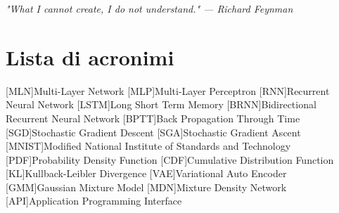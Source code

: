 \documentclass[twoside,openright,titlepage,fleqn,
	headinclude,12pt,a4paper,BCOR=5mm,footinclude]{scrbook}
\begin{document}
\frenchspacing
\raggedbottom
{}
\pagestyle{plain}

\pagestyle{scrheadings}
\tableofcontents
\listoffigures
\cleardoublepage
\thispagestyle{empty}
\begin{flushright}
\null{}
\emph{"What I cannot create, I do not understand." \break --- Richard Feynman} \null
\end{flushright}
\cleardoublepage




% 



\newpage
\section{Lista di acronimi} %
\label{sec:lista_di_acronimi}
\begin{acronym}
	[MLN]{Multi-Layer Network}
	[MLP]{Multi-Layer Perceptron}
	[RNN]{Recurrent Neural Network}
	[LSTM]{Long Short Term Memory}
	[BRNN]{Bidirectional Recurrent Neural Network}
	[BPTT]{Back Propagation Through Time}
	[SGD]{Stochastic Gradient Descent}
	[SGA]{Stochastic Gradient Ascent}
	[MNIST]{Modified National Institute of Standards and Technology}
	[PDF]{Probability Density Function}
	[CDF]{Cumulative Distribution Function}
	[KL]{Kullback-Leibler Divergence}
	[VAE]{Variational Auto Encoder}
	[GMM]{Gaussian Mixture Model}
	[MDN]{Mixture Density Network}
	[API]{Application Programming Interface}
\end{acronym}
\end{document}
